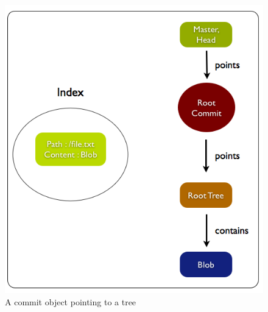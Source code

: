 \pagebreak 
\begin{figure}[h!] 
	\caption{A commit object pointing to a tree}
	\centering
	\includegraphics[scale=0.50]{images/commit_object.png}
\end{figure}


